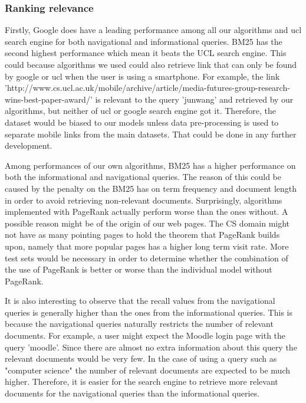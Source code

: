 \subsubsection{Ranking relevance}
Firstly, Google does have a leading performance among all our algorithms and ucl search engine for both navigational and informational queries. BM25 has the second highest performance which mean it beats the UCL search engine. This could because algorithms we used could also retrieve link that can only be found by google or ucl when the user is using a smartphone. For example, the link 'http://www.cs.ucl.ac.uk/mobile/archive/article/media-futures-group-research-wins-best-paper-award/' is relevant to the query 'junwang' and retrieved by our algorithms, but neither of ucl or google search engine got it. Therefore, the dataset would be biased to our models unless data pre-processing is used to separate mobile links from the main datasets. That could be done in any further development.

Among performances of our own algorithms, BM25 has a higher performance on both the informational and navigational queries. The reason of this could be caused by the penalty on the BM25 has on term frequency and document length in order to avoid retrieving non-relevant documents. Surprisingly, algorithms implemented with PageRank actually perform worse than the ones without. A possible reason might be of the origin of our web pages. The CS domain might not have as many pointing pages to hold the theorem that PageRank builds upon, namely that more popular pages has a higher long term visit rate.  More test sets would be necessary in order to determine whether the combination of the use of PageRank is better or worse than the individual model without PageRank.

It is also interesting to observe that the recall values from the navigational queries is generally higher than the ones from the informational queries. This is because the navigational queries naturally restricts the number of relevant documents. For example, a user might expect the Moodle login page with the query 'moodle'. Since there are almost no extra information about this query the relevant documents would be very few. In the case of using a query such as "computer science" the number of relevant documents are expected to be much higher. Therefore, it is easier for the search engine to retrieve more relevant documents for the navigational queries than the informational queries.

